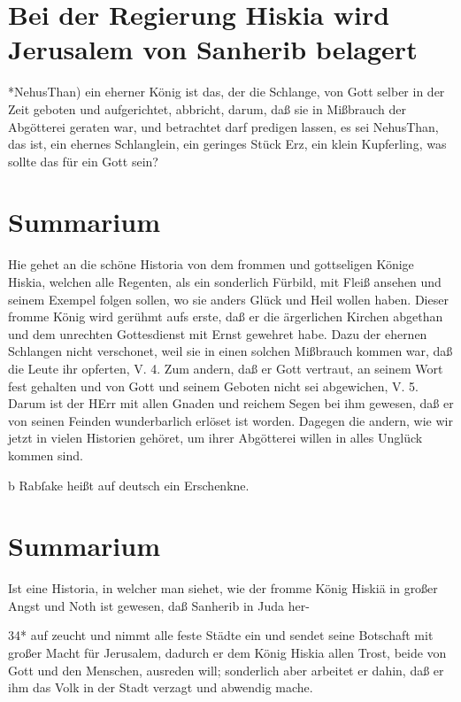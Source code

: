 \section[Bei der Regierung Hiskia wird Jerusalem von Sanherib]{Bei der Regierung Hiskia wird Jerusalem von Sanherib belagert}

*NehusThan) ein eherner König ist das, der die Schlange, von Gott selber in der Zeit geboten und aufgerichtet, abbricht, darum, daß sie in Mißbrauch der Abgötterei geraten war, und betrachtet darf predigen lassen, es sei NehusThan, das ist, ein ehernes Schlanglein, ein geringes Stück Erz, ein klein Kupferling, was sollte das für ein Gott sein?

\section{Summarium}

Hie gehet an die schöne Historia von dem frommen und gottseligen Könige Hiskia, welchen alle Regenten, als ein sonderlich Fürbild, mit Fleiß ansehen und seinem Exempel folgen sollen, wo sie anders Glück und Heil wollen haben. Dieser fromme König wird gerühmt aufs erste, daß er die ärgerlichen Kirchen abgethan und dem unrechten Gottesdienst mit Ernst gewehret habe. Dazu der ehernen Schlangen nicht verschonet, weil sie in einen solchen Mißbrauch kommen war, daß die Leute ihr opferten, V. 4. Zum andern, daß er Gott vertraut, an seinem Wort fest gehalten und von Gott und seinem Geboten nicht sei abgewichen, V. 5. Darum ist der HErr mit allen Gnaden und reichem Segen bei ihm gewesen, daß er von seinen Feinden wunderbarlich erlöset ist worden. Dagegen die andern, wie wir jetzt in vielen Historien
gehöret, um ihrer Abgötterei willen in alles Unglück kommen sind.

b Rabſake heißt auf deutsch ein Erschenkne.

\section{Summarium}

Ist eine Historia, in welcher man siehet, wie der fromme König Hiskiä in großer Angst und Noth ist gewesen, daß Sanherib in Juda her-

34*
auf zeucht und nimmt alle feste Städte ein und sendet seine Botschaft mit großer Macht für Jerusalem, dadurch er dem König Hiskia allen Trost, beide von Gott und den Menschen, ausreden will; sonderlich aber arbeitet er dahin, daß er ihm das Volk in der Stadt verzagt und abwendig mache.

